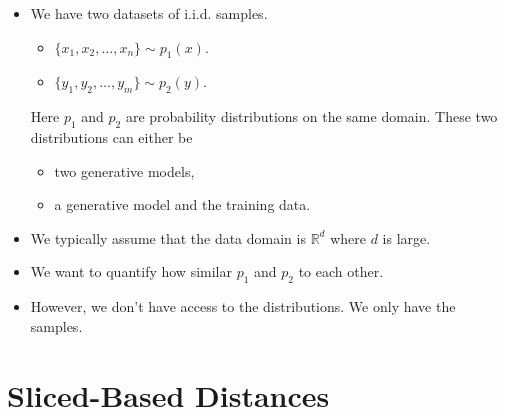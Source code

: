 \documentclass[10pt]{article}
\newcommand{\Real}{\mathbb{R}}
\begin{document}
\begin{itemize}
    \item We have two datasets of i.i.d. samples.
    \begin{itemize}
        \item $\{ x_1, x_2, \dotsc, x_n \} \sim p_1(x)$.
        \item $\{ y_1, y_2, \dotsc, y_m \} \sim p_2(y)$.
    \end{itemize}
    Here $p_1$ and $p_2$ are probability distributions on the same domain.
    These two distributions can either be
    \begin{itemize}
        \item two generative models,
        \item a generative model and the training data.
    \end{itemize}    

    \item We typically assume that the data domain is $\Real^d$ where $d$ is large.

    \item We want to quantify how similar $p_1$ and $p_2$ to each other. 
    
    \item However, we don't have access to the distributions. We only have the samples.
\end{itemize}

\section{Sliced-Based Distances}
\end{document}
